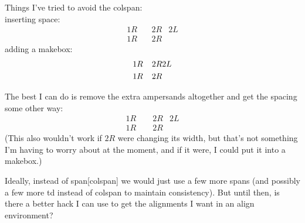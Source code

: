 \documentclass[oneside]{book}
\begin{document}
Things I've tried to avoid the colspan:\\
inserting space:
\begin{align*}1R&\,&2R&2L\\1R&\,&2R&\end{align*}
adding a makebox:
\begin{align*}1R&\makebox[1pt]{}&2R&2L\\1R&\makebox[1pt]{}&2R&\end{align*}

The best I can do is remove the extra ampersands altogether and get the spacing some other way:
\begin{align*}1R\qquad2R&2L\\1R\qquad2R&\end{align*}
(This also wouldn't work if $2R$ were changing its width, but that's not something I'm having to worry about at the moment, and if it were, I could put it into a makebox.)

Ideally, instead of span[colspan] we would just use a few more spans (and possibly a few more td instead of colspan to maintain consistency).  But until then, is there a better hack I can use to get the alignments I want in an align environment?
\end{document}
